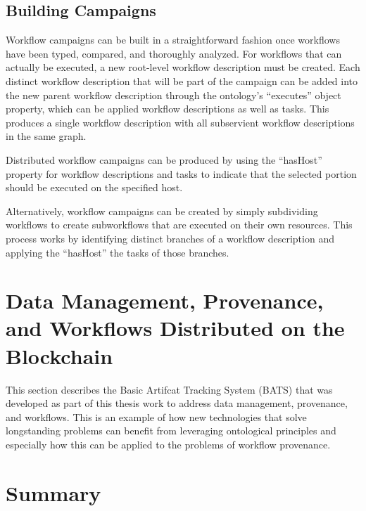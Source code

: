 \subsection{Building Campaigns}

Workflow campaigns can be built in a straightforward fashion once workflows have
been typed, compared, and thoroughly analyzed. For workflows that can actually
be executed, a new root-level workflow description must be created. Each
distinct workflow description that will be part of the campaign can be added
into the new parent workflow description through the ontology's
``executes'' object property, which can be applied workflow descriptions as
well as tasks. This produces a single workflow description with all subservient
workflow descriptions in the same graph.

Distributed workflow campaigns can be produced by using the ``hasHost'' property
for workflow descriptions and tasks to indicate that the selected portion should
be executed on the specified host.

Alternatively, workflow campaigns can be created by simply subdividing
workflows to create subworkflows that are executed on their own resources. This
process works by identifying distinct branches of a workflow description and
applying the ``hasHost'' the tasks of those branches. 

\section{Data Management, Provenance, and Workflows Distributed on the
Blockchain}


This section describes the Basic Artifcat Tracking System (BATS) that
was developed as part of this thesis work to address data management,
provenance, and workflows. This is an example of how new technologies that solve
longstanding problems can benefit from leveraging ontological principles and
especially how this can be applied to the problems of workflow provenance.


\section{Summary}

